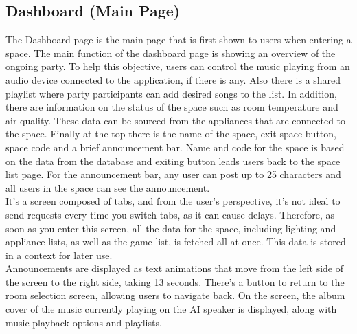\documentclass[conference]{IEEEtran}
\begin{document}
    \subsection{Dashboard (Main Page)}
        The Dashboard page is the main page that is first shown to users when entering a space. The main function of the dashboard page is showing an overview of the ongoing party. To help this objective, users can control the music playing from an audio device connected to the application, if there is any. Also there is a shared playlist where party participants can add desired songs to the list. In addition, there are information on the status of the space such as room temperature and air quality. These data can be sourced from the appliances that are connected to the space. Finally at the top there is the name of the space, exit space button, space code and a brief announcement bar. Name and code for the space is based on the data from the database and exiting button leads users back to the space list page. For the announcement bar, any user can post up to 25 characters and all users in the space can see the announcement.\\
        It's a screen composed of tabs, and from the user's perspective, it's not ideal to send requests every time you switch tabs, as it can cause delays. Therefore, as soon as you enter this screen, all the data for the space, including lighting and appliance lists, as well as the game list, is fetched all at once. This data is stored in a context for later use.\\        
        Announcements are displayed as text animations that move from the left side of the screen to the right side, taking 13 seconds. There's a button to return to the room selection screen, allowing users to navigate back. On the screen, the album cover of the music currently playing on the AI speaker is displayed, along with music playback options and playlists.
\end{document}
